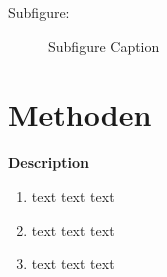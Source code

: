 Subfigure:

\begin{figure}[htbp] 
	\centering
	\caption{Subfigure Caption}
	\label{fig:figure1}
\end{figure} 

\pagebreak

\section{Methoden}


\begin{description}
\item \textbf{Description}
\begin{enumerate}
\item text text text
\item text text text
\item text text text
\end{enumerate}
\end{description}


